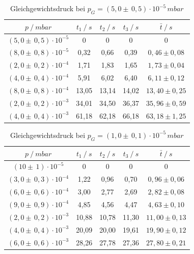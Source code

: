 \begin{table}[H]
\centering
\label{tab:leck_Turbo1}
\begin{tabular}{c|c|c|c|c}
	{$p \:/\: \si{mbar}$} & {$t_1 \:/\: \si{s} $} & {$t_2 \:/\: \si{s} $} & {$t_3 \:/\: \si{s} $} & {$\bar{t} \:/\: \si{s}$}\\
\midrule
$(5,0 \pm \, 0,5)\cdot 10^{-5}$ &0 &0 &0 &0\\
$(8,0 \pm \, 0,8)\cdot 10^{-5}$ &   0,32 &  0,66 &  0,39 & $0,46 \pm 0,08$\\
$(2,0 \pm \, 0,2)\cdot 10^{-4}$ &   1,71  &  1,83 &  1,65 & $1,73 \pm 0,04 $\\
$(4,0 \pm \, 0,4)\cdot 10^{-4}$ &   5,91 &  6,02 &  6,40 & $6,11 \pm 0,12 $\\
$(8,0 \pm \, 0,8)\cdot 10^{-4}$ &   13,05 &  13,14 &  14,02 & $13,40 \pm 0,25 $\\
$(2,0 \pm \, 0,2)\cdot 10^{-3}$ &   34,01 &  34,50 &  36,37 & $35,96 \pm 0,59 $\\
$(4,0 \pm \, 0,4)\cdot 10^{-3}$ &  61,18 & 62,18 & 66,18 & $63,18 \pm 1,25 $\\
\end{tabular}
\caption{Gleichgewichtsdruck bei $p_G=(5,0 \pm \, 0,5)\cdot 10^{-5} \, \si{mbar}$}
\end{table}

\begin{table}[H]
\centering
\label{tab:leck_Turbo2}
\begin{tabular}{c|c|c|c|c}
	{$p \:/\: \si{mbar}$} & {$t_1 \:/\: \si{s} $} & {$t_2 \:/\: \si{s} $} & {$t_3 \:/\: \si{s} $} & {$\bar{t} \:/\: \si{s}$}\\
\midrule
$(10 \pm \, 1)\cdot 10^{-5}$ &0 &0 &0 &0\\
$(3,0 \pm \, 0,3)\cdot 10^{-4}$ &   1,22 &  0,96 &  0,70 & $0,96 \pm 0,06$\\
$(6,0 \pm \, 0,6)\cdot 10^{-4}$ &   3,00  &  2,77 &  2,69 & $2,82 \pm 0,08 $\\
$(9,0 \pm \, 0,9)\cdot 10^{-4}$ &   4,85 &  4,56 &  4,47 & $4,63 \pm 0,10 $\\
$(2,0 \pm \, 0,2)\cdot 10^{-3}$ &   10,88 &  10,78 &  11,30 & $11,00 \pm 0,13 $\\
$(4,0 \pm \, 0,4)\cdot 10^{-3}$ &   20,09 &  20,00 &  19,61 & $19,90 \pm 0,12 $\\
$(6,0 \pm \, 0,6)\cdot 10^{-3}$ &  28,26 & 27,78 & 27,36 & $27,80 \pm 0,21 $\\
\end{tabular}
\caption{Gleichgewichtsdruck bei $p_G=(1,0 \pm \, 0,1)\cdot 10^{-5} \, \si{mbar}$}
\end{table}

